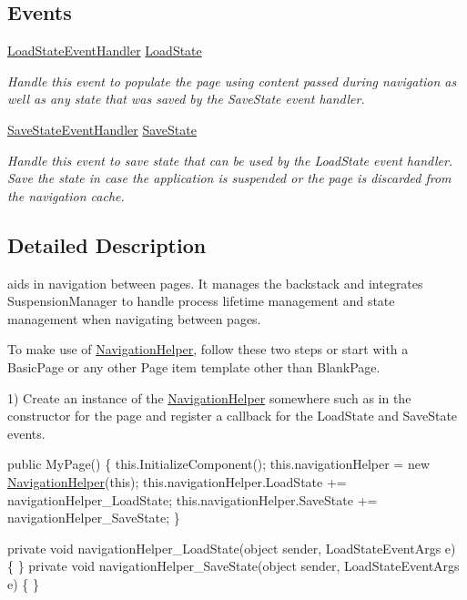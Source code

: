 \subsection*{Events}
\begin{DoxyCompactItemize}
\item 
\hyperlink{namespace_listen_to_me_1_1_common_a7d7e529a5b6741d55bc043ba136c4978}{Load\+State\+Event\+Handler} \hyperlink{class_listen_to_me_1_1_common_1_1_navigation_helper_a8179285cdfdfeb3a5b80f2e6c8150743}{Load\+State}
\begin{DoxyCompactList}\small\item\em Handle this event to populate the page using content passed during navigation as well as any state that was saved by the Save\+State event handler. \end{DoxyCompactList}\item 
\hyperlink{namespace_listen_to_me_1_1_common_a75a2e49e8dd247f0cc35403c67a48a18}{Save\+State\+Event\+Handler} \hyperlink{class_listen_to_me_1_1_common_1_1_navigation_helper_a63888f37f25238442c4f5f68af554541}{Save\+State}
\begin{DoxyCompactList}\small\item\em Handle this event to save state that can be used by the Load\+State event handler. Save the state in case the application is suspended or the page is discarded from the navigation cache. \end{DoxyCompactList}\end{DoxyCompactItemize}


\subsection{Detailed Description}
aids in navigation between pages. It manages the backstack and integrates Suspension\+Manager to handle process lifetime management and state management when navigating between pages. 

To make use of \hyperlink{class_listen_to_me_1_1_common_1_1_navigation_helper}{Navigation\+Helper}, follow these two steps or start with a Basic\+Page or any other Page item template other than Blank\+Page.

1) Create an instance of the \hyperlink{class_listen_to_me_1_1_common_1_1_navigation_helper}{Navigation\+Helper} somewhere such as in the constructor for the page and register a callback for the Load\+State and Save\+State events. 
\begin{DoxyCode}
\textcolor{keyword}{public} MyPage()
\{
    this.InitializeComponent();
    this.navigationHelper = \textcolor{keyword}{new} \hyperlink{class_listen_to_me_1_1_common_1_1_navigation_helper_a129e86f4035b95d45005c0f8326a9f66}{NavigationHelper}(\textcolor{keyword}{this});
    this.navigationHelper.LoadState += navigationHelper\_LoadState;
    this.navigationHelper.SaveState += navigationHelper\_SaveState;
\}

\textcolor{keyword}{private} \textcolor{keywordtype}{void} navigationHelper\_LoadState(\textcolor{keywordtype}{object} sender, LoadStateEventArgs e)
\{ \}
\textcolor{keyword}{private} \textcolor{keywordtype}{void} navigationHelper\_SaveState(\textcolor{keywordtype}{object} sender, LoadStateEventArgs e)
\{ \}
\end{DoxyCode}



